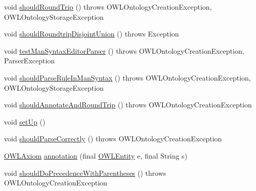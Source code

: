 \begin{DoxyCompactItemize}
\item 
void \hyperlink{classorg_1_1semanticweb_1_1owlapi_1_1api_1_1test_1_1syntax_1_1_manchester_o_w_l_syntax_parser_test_case_ac2632490e600ea6bf6b71b11fd295c04}{should\-Round\-Trip} ()  throws O\-W\-L\-Ontology\-Creation\-Exception,             O\-W\-L\-Ontology\-Storage\-Exception 
\item 
void \hyperlink{classorg_1_1semanticweb_1_1owlapi_1_1api_1_1test_1_1syntax_1_1_manchester_o_w_l_syntax_parser_test_case_add597cd156ddeed3ba11efd92717d94c}{should\-Roundtrip\-Disjoint\-Union} ()  throws Exception 
\item 
void \hyperlink{classorg_1_1semanticweb_1_1owlapi_1_1api_1_1test_1_1syntax_1_1_manchester_o_w_l_syntax_parser_test_case_af8ec3c1902f89aba3acc3d74093bfb55}{test\-Man\-Syntax\-Editor\-Parser} ()  throws O\-W\-L\-Ontology\-Creation\-Exception,             Parser\-Exception 
\item 
void \hyperlink{classorg_1_1semanticweb_1_1owlapi_1_1api_1_1test_1_1syntax_1_1_manchester_o_w_l_syntax_parser_test_case_a3d9f4357ae6c51ad1ac4f51a9fa16d36}{should\-Parse\-Rule\-In\-Man\-Syntax} ()  throws O\-W\-L\-Ontology\-Creation\-Exception,             O\-W\-L\-Ontology\-Storage\-Exception 
\item 
void \hyperlink{classorg_1_1semanticweb_1_1owlapi_1_1api_1_1test_1_1syntax_1_1_manchester_o_w_l_syntax_parser_test_case_ae58c28202c7d7f743414e58b79b7219d}{should\-Annotate\-And\-Round\-Trip} ()  throws O\-W\-L\-Ontology\-Creation\-Exception 
\item 
void \hyperlink{classorg_1_1semanticweb_1_1owlapi_1_1api_1_1test_1_1syntax_1_1_manchester_o_w_l_syntax_parser_test_case_ad634ce24c8a8add184e716a99f82eeb4}{set\-Up} ()
\item 
void \hyperlink{classorg_1_1semanticweb_1_1owlapi_1_1api_1_1test_1_1syntax_1_1_manchester_o_w_l_syntax_parser_test_case_a21da6d11fa7bf96cf5c0ba07ef7829b2}{should\-Parse\-Correctly} ()  throws O\-W\-L\-Ontology\-Creation\-Exception 
\item 
\hyperlink{interfaceorg_1_1semanticweb_1_1owlapi_1_1model_1_1_o_w_l_axiom}{O\-W\-L\-Axiom} \hyperlink{classorg_1_1semanticweb_1_1owlapi_1_1api_1_1test_1_1syntax_1_1_manchester_o_w_l_syntax_parser_test_case_a11ae59d004ca1c0f03ba79a67decf019}{annotation} (final \hyperlink{interfaceorg_1_1semanticweb_1_1owlapi_1_1model_1_1_o_w_l_entity}{O\-W\-L\-Entity} e, final String s)
\item 
void \hyperlink{classorg_1_1semanticweb_1_1owlapi_1_1api_1_1test_1_1syntax_1_1_manchester_o_w_l_syntax_parser_test_case_a117a8a28e6eb78964168e71d56e26adc}{should\-Do\-Precedence\-With\-Parentheses} ()  throws O\-W\-L\-Ontology\-Creation\-Exception 

\end{DoxyCompactItemize}
